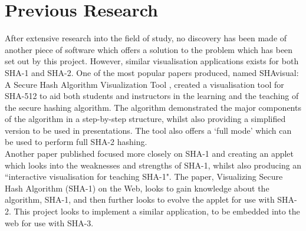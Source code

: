 \section{Previous Research}
After extensive research into the field of study, no discovery has been made of another piece of software which offers a solution to the problem which has been set out by this project. However, similar visualisation applications exists for both SHA-1 and SHA-2. One of the most popular papers produced, named SHAvisual: A Secure Hash Algorithm Visualization Tool \cite{SHAvisual}, created a visualisation tool for SHA-512 to aid both students and instructors in the learning and the teaching of the secure hashing algorithm. The algorithm demonstrated the major components of the algorithm in a step-by-step structure, whilst also providing a simplified version to be used in presentations. The tool also offers a `full mode' which can be used to perform full SHA-2 hashing. 
\vspace{5 mm}\\
Another paper\cite{VisSHA1} published focused more closely on SHA-1 and creating an applet which looks into the weaknesses and strengths of SHA-1, whilst also producing an ``interactive visualisation for teaching SHA-1". The paper, Visualizing Secure Hash Algorithm (SHA-1) on the Web, looks to gain knowledge about the algorithm, SHA-1, and then further looks to evolve the applet for use with SHA-2. This project looks to implement a similar application, to be embedded into the web for use with SHA-3.
